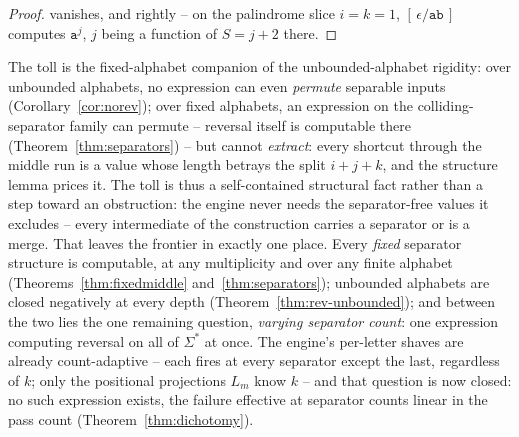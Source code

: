 \documentclass[runningheads,envcountsect]{llncs}
\begin{document}
\begin{proof}
vanishes, and rightly -- on the palindrome slice $i = k = 1$, $[\,\epsilon/\mathtt{ab}\,]$ computes $\mathtt a^{j}$, $j$ being a function of $S = j + 2$ there.
\end{proof}

\noindent The toll is the fixed-alphabet companion of the unbounded-alphabet rigidity: over unbounded alphabets, no expression can even \emph{permute} separable inputs (Corollary~\ref{cor:norev}); over fixed alphabets, an expression on the colliding-separator family can permute -- reversal itself is computable there (Theorem~\ref{thm:separators}) -- but cannot \emph{extract}: every shortcut through the middle run is a value whose length betrays the split $i + j + k$, and the structure lemma prices it. The toll is thus a self-contained structural fact rather than a step toward an obstruction: the engine never needs the separator-free values it excludes -- every intermediate of the construction carries a separator or is a merge. That leaves the frontier in exactly one place. Every \emph{fixed} separator structure is computable, at any multiplicity and over any finite alphabet (Theorems~\ref{thm:fixedmiddle} and~\ref{thm:separators}); unbounded alphabets are closed negatively at every depth (Theorem~\ref{thm:rev-unbounded}); and between the two lies the one remaining question, \emph{varying separator count}: one expression computing reversal on all of $\Sigma^*$ at once. The engine's per-letter shaves are already count-adaptive -- each fires at every separator except the last, regardless of $k$; only the positional projections $L_m$ know $k$ -- and that question is now closed: no such expression exists, the failure effective at separator counts linear in the pass count (Theorem~\ref{thm:dichotomy}).
\end{document}
